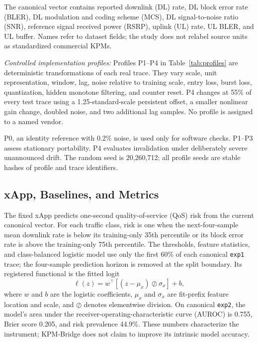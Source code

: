 \documentclass[10pt,journal,twoside]{IEEEtran}
\begin{document}
The canonical vector contains reported downlink (DL) rate, DL block error rate (BLER), DL modulation and coding scheme (MCS), DL signal-to-noise ratio (SNR), reference signal received power (RSRP), uplink (UL) rate, UL BLER, and UL buffer. Names refer to dataset fields; the study does not relabel source units as standardized commercial KPMs.



\emph{Controlled implementation profiles:}
Profiles P1--P4 in Table~\ref{tab:profiles} are deterministic transformations of each real trace. They vary scale, unit representation, window, lag, noise relative to training scale, entry loss, burst loss, quantization, hidden monotone filtering, and counter reset. P4 changes at 55\% of every test trace using a 1.25-standard-scale persistent offset, a smaller nonlinear gain change, doubled noise, and two additional lag samples. No profile is assigned to a named vendor.

P0, an identity reference with 0.2\% noise, is used only for software checks. P1--P3 assess stationary portability. P4 evaluates invalidation under deliberately severe unannounced drift. The random seed is 20,260,712; all profile seeds are stable hashes of profile and trace identifiers.

\subsection{xApp, Baselines, and Metrics}
The fixed xApp predicts one-second quality-of-service (QoS) risk from the current canonical vector. For each traffic class, risk is one when the next-four-sample mean downlink rate is below its training-only 35th percentile or its block error rate is above the training-only 75th percentile. The thresholds, feature statistics, and class-balanced logistic model use only the first 60\% of each canonical \texttt{exp1} trace; the four-sample prediction horizon is removed at the split boundary. Its registered functional is the fitted logit
\begin{equation}
\ell(z)=w^\top\!\left[(z-\mu_x)\oslash\sigma_x\right]+b,
\label{eq:xapp-logit}
\end{equation}
where $w$ and $b$ are the logistic coefficients, $\mu_x$ and $\sigma_x$ are fit-prefix feature location and scale, and $\oslash$ denotes elementwise division. On canonical \texttt{exp2}, the model's area under the receiver-operating-characteristic curve (AUROC) is 0.755, Brier score 0.205, and risk prevalence 44.9\%. These numbers characterize the instrument; KPM-Bridge does not claim to improve its intrinsic model accuracy.
\end{document}
